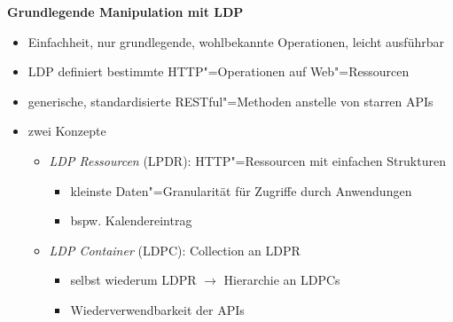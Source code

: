 \textbf{Grundlegende Manipulation mit LDP}
\begin{itemize}
    \item Einfachheit, nur grundlegende, wohlbekannte Operationen, leicht ausführbar
    \item LDP definiert bestimmte HTTP"=Operationen auf Web"=Ressourcen~\cite{sambraSolidPlatformDecentralized2016}
    \item generische, standardisierte RESTful"=Methoden anstelle von starren APIs~\cite{sambraSolidPlatformDecentralized2016}
    \item zwei Konzepte
    \begin{itemize}
        \item \emph{LDP Ressourcen} (LPDR): HTTP"=Ressourcen mit einfachen Strukturen
        \begin{itemize}
            \item kleinste Daten"=Granularität für Zugriffe durch Anwendungen
            \item bspw. Kalendereintrag
        \end{itemize}
        \item \emph{LDP Container} (LDPC): Collection an LDPR
        \begin{itemize}
            \item selbst wiederum LDPR $\to$ Hierarchie an LDPCs
            \item Wiederverwendbarkeit der APIs~\cite{sambraSolidPlatformDecentralized2016}
        \end{itemize}
    \end{itemize}
\end{itemize}

\vspace{1cm}

